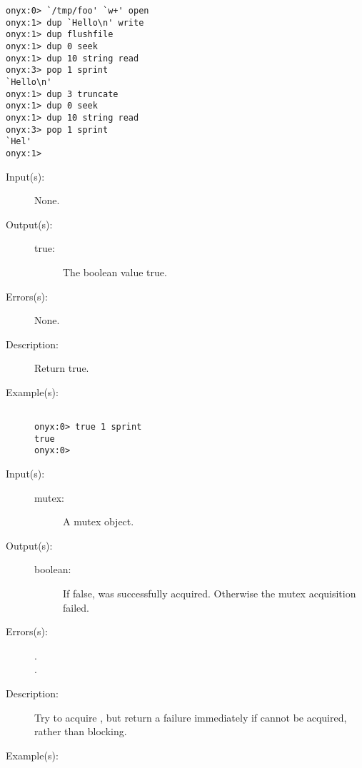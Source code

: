 \begin{description}
\begin{description}
\begin{verbatim}
onyx:0> `/tmp/foo' `w+' open
onyx:1> dup `Hello\n' write
onyx:1> dup flushfile
onyx:1> dup 0 seek
onyx:1> dup 10 string read
onyx:3> pop 1 sprint
`Hello\n'
onyx:1> dup 3 truncate
onyx:1> dup 0 seek
onyx:1> dup 10 string read
onyx:3> pop 1 sprint
`Hel'
onyx:1>
		\end{verbatim}
	\end{description}
\label{systemdict:true}
\item[{\onyxop{--}{true}{true}}: ]
	\begin{description}\item[]
	\item[Input(s): ] None.
	\item[Output(s): ]
		\begin{description}\item[]
		\item[true: ]
			The boolean value true.
		\end{description}
	\item[Errors(s): ] None.
	\item[Description: ]
		Return true.
	\item[Example(s): ]\begin{verbatim}

onyx:0> true 1 sprint
true
onyx:0>
		\end{verbatim}
	\end{description}
\label{systemdict:trylock}
\item[{\onyxop{mutex}{trylock}{boolean}}: ]
	\begin{description}\item[]
	\item[Input(s): ]
		\begin{description}\item[]
		\item[mutex: ]
			A mutex object.
		\end{description}
	\item[Output(s): ]
		\begin{description}\item[]
		\item[boolean: ]
			If false,  was successfully acquired.
			Otherwise the mutex acquisition failed.
		\end{description}
	\item[Errors(s): ]
		\begin{description}\item[]
		\item[.]
		\item[.]
		\end{description}
	\item[Description: ]
		Try to acquire , but return a failure immediately
		if  cannot be acquired, rather than blocking.
	\item[Example(s): ]\begin{verbatim}


\end{verbatim}
\end{description}
\end{description}
